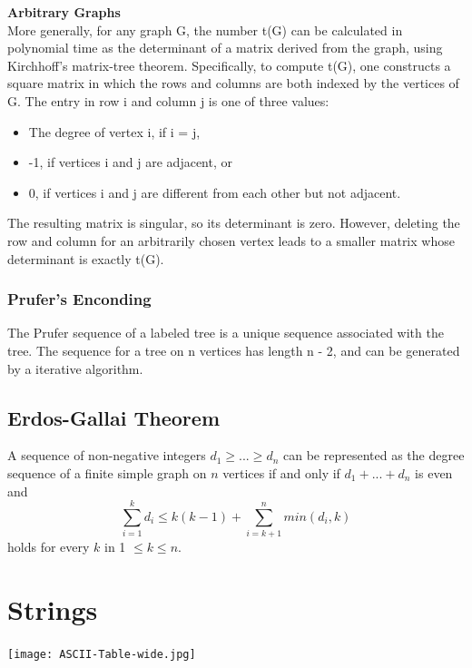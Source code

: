 \documentclass[10pt, twocolumn]{article}
\begin{document}
\begin{flushleft}
\textbf{Arbitrary Graphs}\\
More generally, for any graph G, the number t(G) can be calculated in polynomial time as the determinant of a matrix derived from the graph, using Kirchhoff's matrix-tree theorem. Specifically, to compute t(G), one constructs a square matrix in which the rows and columns are both indexed by the vertices of G. The entry in row i and column j is one of three values:
\begin{itemize}
\item The degree of vertex i, if i = j,
\item -1, if vertices i and j are adjacent, or
\item 0, if vertices i and j are different from each other but not adjacent.
\end{itemize}
The resulting matrix is singular, so its determinant is zero. However, deleting the row and column for an arbitrarily chosen vertex leads to a smaller matrix whose determinant is exactly t(G).\\[0.2cm]

\subsubsection{Prufer's Enconding}
The Prufer sequence of a labeled tree is a unique sequence associated with the tree. The sequence for a tree on n vertices has length n - 2, and can be generated by a iterative algorithm.

\subsection{Erdos-Gallai Theorem}
A sequence of non-negative integers $d_1 \geq ... \geq d_n$ can be represented as the degree sequence of a finite simple graph on $n$ vertices if and only if $d_1 + ... + d_n$ is even and
$$\sum_{i=1}^{k} d_i \leq k(k-1) + \sum_{i=k+1}^{n} min(d_i, k)$$
holds for every $k$ in 1 $\leq k \leq n$.



\section{Strings}

\begin{center}
\texttt{[image: ASCII-Table-wide.jpg]}
\end{center}




\end{flushleft}
\end{document}
